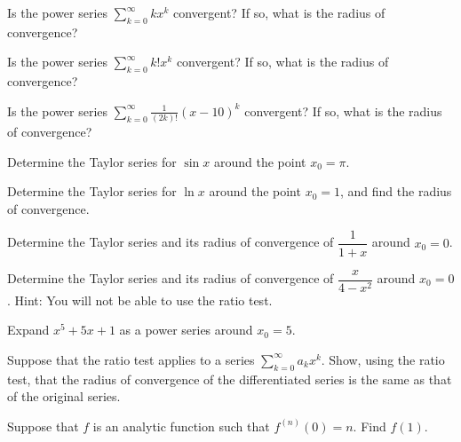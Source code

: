 \documentclass[12pt]{book}
\begin{document}
\begin{exercise}
Is the power series $\displaystyle \sum_{k=0}^\infty k x^k$ convergent?
If so, what is the radius of convergence?
\end{exercise}

\begin{exercise}
Is the power series $\displaystyle \sum_{k=0}^\infty k! x^k$ convergent?
If so, what is the radius of convergence?
\end{exercise}

\begin{exercise}
Is the power series $\displaystyle \sum_{k=0}^\infty \frac{1}{(2k)!} {(x-10)}^k$
convergent?  If so, what is the radius of convergence?
\end{exercise}

\begin{exercise}
Determine the Taylor series for $\sin x$ around the point $x_0 = \pi$.
\end{exercise}

\begin{exercise}
Determine the Taylor series for $\ln x$ around the point $x_0 = 1$,
and find the radius of convergence.
\end{exercise}

\begin{exercise}
Determine the Taylor series
and its radius of convergence of $\dfrac{1}{1+x}$
around $x_0 = 0$.
\end{exercise}

\begin{exercise}
Determine the Taylor series and its radius of convergence
of
$\dfrac{x}{4-x^2}$ around $x_0 = 0$.  Hint: You will not be able to
use the ratio test.
\end{exercise}

\begin{exercise}
Expand $x^5+5x+1$ as a power series around $x_0 = 5$.
\end{exercise}

\begin{exercise}
Suppose that the ratio test applies to a series
$\displaystyle \sum_{k=0}^\infty a_k x^k$.  Show, using the ratio
test, that the radius of convergence of the differentiated
series is the same as that of the original series.
\end{exercise}

\begin{exercise}
Suppose that $f$ is an analytic function such that
$f^{(n)}(0) = n$.  Find $f(1)$.
\end{exercise}
\end{document}
